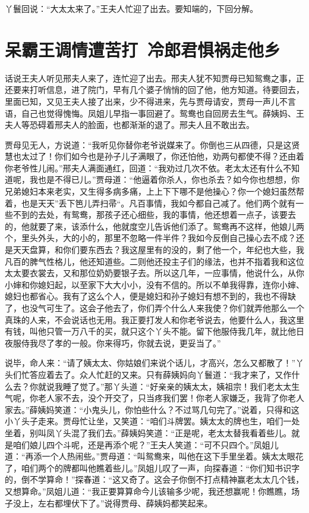 \documentclass[12pt,oneside]{book}
\begin{document}
丫鬟回说：“大太太来了。”王夫人忙迎了出去。要知端的，下回分解。 




\chapter{呆霸王调情遭苦打~冷郎君惧祸走他乡}
话说王夫人听见邢夫人来了，连忙迎了出去。邢夫人犹不知贾母已知鸳鸯之事，正还要来打听信息，进了院门，早有几个婆子悄悄的回了他，他方知道。待要回去，里面已知，又见王夫人接了出来，少不得进来，先与贾母请安，贾母一声儿不言语，自己也觉得愧悔。凤姐儿早指一事回避了。鸳鸯也自回房去生气。薛姨妈、王夫人等恐碍着邢夫人的脸面，也都渐渐的退了。邢夫人且不敢出去。

贾母见无人，方说道：“我听见你替你老爷说媒来了。你倒也三从四德，只是这贤慧也太过了！你们如今也是孙子儿子满眼了，你还怕他，劝两句都使不得？还由着你老爷性儿闹。”邢夫人满面通红，回道：“我劝过几次不依。老太太还有什么不知道呢，我也是不得已儿。”贾母道：“他逼着你杀人，你也杀去？如今你也想想，你兄弟媳妇本来老实，又生得多病多痛，上上下下哪不是他操心？你一个媳妇虽然帮着，也是天天”丢下笆儿弄扫帚“。凡百事情，我如今都自己减了。他们两个就有一些不到的去处，有鸳鸯，那孩子还心细些，我的事情，他还想着一点子，该要去的，他就要了来，该添什么，他就度空儿告诉他们添了。鸳鸯再不这样，他娘儿两个，里头外头，大的小的，那里不忽略一件半件？我如今反倒自己操心去不成？还是天天盘算，和你们要东西去？我这屋里有的没的，剩了他一个，年纪也大些，我凡百的脾气性格儿，他还知道些。二则他还投主子们的缘法，也并不指着我和这位太太要衣裳去，又和那位奶奶要银子去。所以这几年，一应事情，他说什么，从你小婶和你媳妇起，以至家下大大小小，没有不信的。所以不单我得靠，连你小婶、媳妇也都省心。我有了这么个人，便是媳妇和孙子媳妇有想不到的，我也不得缺了，也没气可生了。这会子他去了，你们弄个什么人来我使？你们就弄他那么一个真珠的人来，不会说话也无用。我正要打发人和你老爷说去，他要什么人，我这里有钱，叫他只管一万八千的买，就只这个丫头不能。留下他服侍我几年，就比他日夜服侍我尽了孝的一般。你来得巧，你就去说，更妥当了。”

说毕，命人来：“请了姨太太、你姑娘们来说个话儿，才高兴，怎么又都散了！”丫头们忙答应着去了。众人忙赶的又来。只有薛姨妈向丫鬟道：“我才来了，又作什么去？你就说我睡了觉了。”那丫头道：“好亲亲的姨太太，姨祖宗！我们老太太生气呢，你老人家不去，没个开交了，只当疼我们罢！你老人家嫌乏，我背了你老人家去。”薛姨妈笑道：“小鬼头儿，你怕些什么？不过骂几句完了。”说着，只得和这小丫头子走来。贾母忙让坐，又笑道：“咱们斗牌罢。姨太太的牌也生，咱们一处坐着，别叫凤丫头混了我们去。”薛姨妈笑道：“正是呢，老太太替我看着些儿。就是咱们娘儿四个斗呢，还是再添个呢？”王夫人笑道：“可不只四个。”凤姐儿道：“再添一个人热闹些。”贾母道：“叫鸳鸯来，叫他在这下手里坐着。姨太太眼花了，咱们两个的牌都叫他瞧着些儿。”凤姐儿叹了一声，向探春道：“你们知书识字的，倒不学算命！”探春道：“这又奇了。这会子你倒不打点精神赢老太太几个钱，又想算命。”凤姐儿道：“我正要算算命今儿该输多少呢，我还想赢呢！你瞧瞧，场子没上，左右都埋伏下了。”说得贾母、薛姨妈都笑起来。
\end{document}
